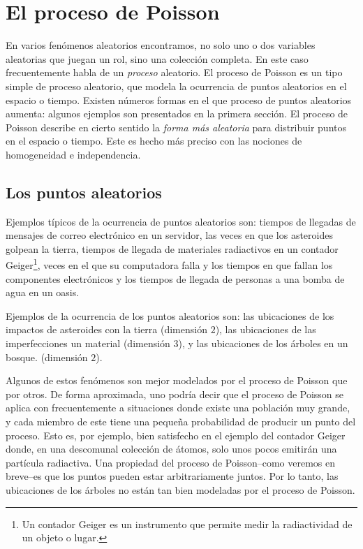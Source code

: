 \section{El proceso de Poisson}\label{sec:12}

	En varios fenómenos aleatorios encontramos, no solo uno o dos variables aleatorias que juegan un rol, sino una colección completa. En este caso frecuentemente habla de un \textit{proceso} aleatorio. El proceso de Poisson es un tipo simple de proceso aleatorio, que modela la ocurrencia de puntos aleatorios en el espacio o tiempo. Existen números formas en el que proceso de puntos aleatorios aumenta: algunos ejemplos son presentados en la primera sección. El proceso de Poisson describe en cierto sentido la \textit{forma más aleatoria} para distribuir puntos en el espacio o tiempo. Este es hecho más preciso con las nociones de homogeneidad e independencia.

\subsection{Los puntos aleatorios}

	Ejemplos típicos de la ocurrencia de puntos aleatorios son: tiempos de llegadas de mensajes de correo electrónico en un servidor, las veces en que los asteroides golpean la tierra, tiempos de llegada de materiales radiactivos en un contador Geiger\footnote{Un contador Geiger es un instrumento que permite medir la radiactividad de un objeto o lugar.}, veces en el que su computadora falla y los tiempos en que fallan los componentes electrónicos y los tiempos de llegada de personas a una bomba de agua en un oasis.

	Ejemplos de la ocurrencia de los puntos aleatorios son: las ubicaciones de los impactos de asteroides con la tierra (dimensión $2$), las ubicaciones de las imperfecciones un material (dimensión $3$), y las ubicaciones de los árboles en un bosque. (dimensión $2$).

	Algunos de estos fenómenos son mejor modelados por el proceso de Poisson que por otros. De forma aproximada, uno podría decir que el proceso de Poisson se aplica con frecuentemente a situaciones donde existe una población muy grande, y cada miembro de este tiene una pequeña probabilidad de producir un punto del proceso. Esto es, por ejemplo, bien satisfecho en el ejemplo del contador Geiger donde, en una descomunal colección de átomos, solo unos pocos emitirán una partícula radiactiva. Una propiedad del proceso de Poisson--como veremos en breve--es que los puntos pueden estar arbitrariamente juntos. Por lo tanto, las ubicaciones de los árboles no están tan bien modeladas por el proceso de Poisson.

